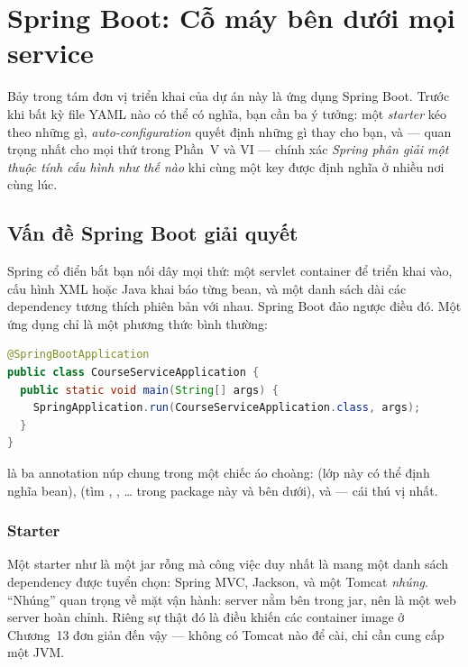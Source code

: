 \chapter{Spring Boot: Cỗ máy bên dưới mọi service}
\label{ch:springboot}

Bảy trong tám đơn vị triển khai của dự án này là ứng dụng Spring Boot.
Trước khi bất kỳ file YAML nào có thể có nghĩa, bạn cần ba ý tưởng: một
\emph{starter} kéo theo những gì, \emph{auto-configuration} quyết định
những gì thay cho bạn, và --- quan trọng nhất cho mọi thứ trong Phần~V và
VI --- chính xác \emph{Spring phân giải một thuộc tính cấu hình như thế
nào} khi cùng một key được định nghĩa ở nhiều nơi cùng lúc.

\section{Vấn đề Spring Boot giải quyết}

Spring cổ điển bắt bạn nối dây mọi thứ: một servlet container để triển
khai vào, cấu hình XML hoặc Java khai báo từng bean, và một danh sách dài
các dependency tương thích phiên bản với nhau. Spring Boot đảo ngược điều
đó. Một ứng dụng chỉ là một phương thức  bình thường:

\begin{lstlisting}[language=Java]
@SpringBootApplication
public class CourseServiceApplication {
  public static void main(String[] args) {
    SpringApplication.run(CourseServiceApplication.class, args);
  }
}
\end{lstlisting}

 là ba annotation núp chung trong một chiếc
áo choàng:  (lớp này có thể định nghĩa bean),
 (tìm , ,
\ldots{} trong package này và bên dưới), và 
--- cái thú vị nhất.

\subsection{Starter}

Một starter như  là một jar rỗng mà công
việc duy nhất là mang một danh sách dependency được tuyển chọn: Spring
MVC, Jackson, và một Tomcat \emph{nhúng}. ``Nhúng'' quan trọng về mặt vận
hành: server nằm bên trong jar, nên 
là một web server hoàn chỉnh. Riêng sự thật đó là điều khiến các
container image ở Chương~13 đơn giản đến vậy --- không có Tomcat nào để
cài, chỉ cần cung cấp một JVM.

